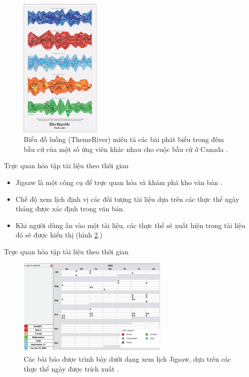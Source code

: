\documentclass[10pt]{beamer}
\theoremstyle{remark}
\theoremstyle{definition}
\begin{document}
\begin{figure}[h!]
	\centering
	\includegraphics[width=0.35\textwidth]{15.png}
	\caption{Biểu đồ luồng (ThemeRiver) miêu tả các bài phát biểu trong đêm bầu cử của một số ứng viên khác nhau cho cuộc bầu cử ở Canada \cite{173}.}
	\label{fig:15}
\end{figure}

\begin{frame}{Trực quan hóa tập tài liệu theo thời gian}
	\begin{itemize}
		\item Jigsaw là một công cụ để trực quan hóa và khám phá kho văn bản \cite{155}.
		\item Chế độ xem lịch định vị các đối tượng tài liệu dựa trên các thực thể ngày tháng được xác định trong văn bản.
		\item Khi người dùng ấn vào một tài liệu, các thực thể sẽ xuất hiện trong tài liệu đó sẽ được hiển thị (hình \ref{fig:16}.)
	\end{itemize}
\end{frame}

\begin{frame}{Trực quan hóa tập tài liệu theo thời gian}
	\begin{figure}[h!]
        \centering
        \includegraphics[width=0.65\textwidth]{16.png}
        \caption{Các bài báo được trình bày dưới dạng xem lịch Jigsaw, dựa trên các thực thể ngày được trích xuất \cite{155}.}
        \label{fig:16}
    \end{figure}
\end{frame}
\end{document}
